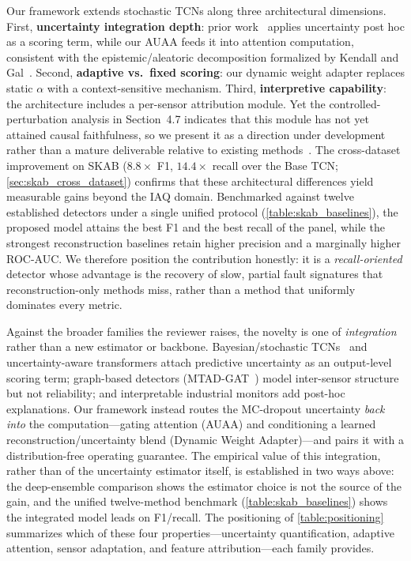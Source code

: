 Our framework extends stochastic TCNs along three architectural dimensions. First, \textbf{uncertainty integration depth}: prior work~\cite{ghimire_electricity_2025, cui_sde-hnn_2025} applies uncertainty post hoc as a scoring term, while our AUAA feeds it into attention computation, consistent with the epistemic/aleatoric decomposition formalized by Kendall and Gal~\cite{kendall2017uncertainties}. Second, \textbf{adaptive vs.\ fixed scoring}: our dynamic weight adapter replaces static $\alpha$ with a context-sensitive mechanism. Third, \textbf{interpretive capability}: the architecture includes a per-sensor attribution module. Yet the controlled-perturbation analysis in Section~4.7 indicates that this module has not yet attained causal faithfulness, so we present it as a direction under development rather than a mature deliverable relative to existing methods~\cite{audibert2020usad, malhotra2016lstmed,zhao2020mtadgat}. The cross-dataset improvement on SKAB ($8.8\times$ F1, $14.4\times$ recall over the Base TCN; \cref{sec:skab_cross_dataset}) confirms that these architectural differences yield measurable gains beyond the IAQ domain. Benchmarked against twelve established detectors under a single unified protocol (\cref{table:skab_baselines}), the proposed model attains the best F1 and the best recall of the panel, while the strongest reconstruction baselines retain higher precision and a marginally higher ROC-AUC. We therefore position the contribution honestly: it is a \emph{recall-oriented} detector whose advantage is the recovery of slow, partial fault signatures that reconstruction-only methods miss, rather than a method that uniformly dominates every metric.

Against the broader families the reviewer raises, the novelty is one of \emph{integration} rather than a new estimator or backbone. Bayesian/stochastic TCNs~\cite{ghimire_electricity_2025, cui_sde-hnn_2025} and uncertainty-aware transformers attach predictive uncertainty as an output-level scoring term; graph-based detectors (MTAD-GAT~\cite{zhao2020mtadgat}) model inter-sensor structure but not reliability; and interpretable industrial monitors add post-hoc explanations. Our framework instead routes the MC-dropout uncertainty \emph{back into} the computation---gating attention (AUAA) and conditioning a learned reconstruction/uncertainty blend (Dynamic Weight Adapter)---and pairs it with a distribution-free operating guarantee. The empirical value of this integration, rather than of the uncertainty estimator itself, is established in two ways above: the deep-ensemble comparison shows the estimator choice is not the source of the gain, and the unified twelve-method benchmark (\cref{table:skab_baselines}) shows the integrated model leads on F1/recall. The positioning of \cref{table:positioning} summarizes which of these four properties---uncertainty quantification, adaptive attention, sensor adaptation, and feature attribution---each family provides.

